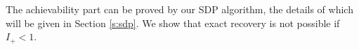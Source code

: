 \documentclass[conference]{IEEEtran}
\begin{document}
%		
		The achievability part can be proved by our SDP algorithm, the details of which will be given in  Section \ref{s:sdp}.
		We show that exact recovery is not possible if $I_+ < 1$. %
		
\end{document}
